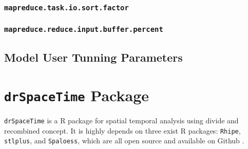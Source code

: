 \subsubsection{\texttt{mapreduce.task.io.sort.factor}}

\subsubsection{\texttt{mapreduce.reduce.input.buffer.percent}}



\subsection{Model User Tunning Parameters}


\section{\texttt{drSpaceTime} Package}

\texttt{drSpaceTime} is a R package for spatial temporal analysis using divide 
and recombined concept. It is highly depends on three exist R packages: 
\texttt{Rhipe}, \texttt{stlplus}, and \texttt{Spaloess}, which are all open 
source and available on Github \cite{github}.